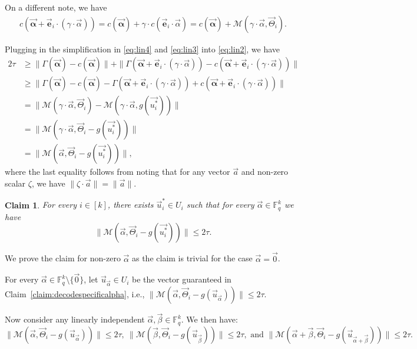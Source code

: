 \documentclass[11pt]{article}
\newcommand{\F}{\mathbb{F}}
\renewcommand{\ge}{ \geqslant}
\renewcommand{\le}{ \leqslant}
\newtheorem{claim}[theorem]{Claim}
\renewcommand{\kappa}{\tau}
\newcommand{\M}{\mathcal{M}}
\begin{document}
 
On a different note, we have
\begin{align}
c(\vec{\bm{\alpha}}+\vec{\bm e}_i\cdot (\gamma\cdot\vec{\alpha}))=c(\vec{\bm{\alpha}})+\gamma\cdot c(\vec{\bm e}_i\cdot \vec{\alpha})=c(\vec{\bm{\alpha}})+\M(\gamma\cdot \vec{\alpha},\vec{\Theta}_i).
\label{eq:lin3}
\end{align}

Plugging in the simplification in \eqref{eq:lin4} and \eqref{eq:lin3} into \eqref{eq:lin2}, we have
\allowdisplaybreaks
\begin{align*}
2\kappa&\ge\|\Gamma(\vec{\bm{\alpha}})-c(\vec{\bm{\alpha}})\|+\|\Gamma(\vec{\bm{\alpha}}+\vec{\bm e}_i\cdot (\gamma\cdot\vec{\alpha}))-c(\vec{\bm{\alpha}}+\vec{\bm e}_i\cdot (\gamma\cdot\vec{\alpha}))\|\\
&\ge\|\Gamma(\vec{\bm{\alpha}})-c(\vec{\bm{\alpha}})-\Gamma(\vec{\bm{\alpha}}+\vec{\bm e}_i\cdot (\gamma\cdot\vec{\alpha}))+c(\vec{\bm{\alpha}}+\vec{\bm e}_i\cdot (\gamma\cdot\vec{\alpha}))\|\\
&=\|\M(\gamma\cdot \vec{\alpha},\vec{\Theta}_i)-\M(\gamma\cdot\vec{\alpha},g(\vec{u_i^\ast})) \|\\
&=\|\M(\gamma\cdot \vec{\alpha},\vec{\Theta}_i-g(\vec{u_i^\ast})) \|\\
&=\|\M(  \vec{\alpha},\vec{\Theta}_i-g(\vec{u_i^\ast})) \|,
\end{align*}
 where the last equality follows from noting that for any vector $\vec{a}$ and non-zero scalar $\zeta$, we have $\|\zeta\cdot \vec{a}\|=\|\vec{a}\|$.



 
 
\begin{claim}\label{claim:decodei}
For every $i\in[k]$, there exists $\vec{u}_i^\ast\in U_i$  such that  for every $\vec{\alpha}\in\F_q^k$ we have $$ \|\M(  \vec{\alpha},\vec{\Theta}_i-g(\vec{u_i^\ast})) \|\le 2\kappa.$$ 
\end{claim}

We prove the claim for non-zero $\vec{\alpha}$ as the claim is trivial for the case $\vec{\alpha}=\vec{0}$.

For every $\vec{\alpha}\in\F_q^k\setminus \{\vec{0}\}$, let $\vec{u}_{\vec{\alpha}}\in U_i$ be the vector guaranteed in Claim~\ref{claim:decodespecificalpha}, i.e., 
$\|\M(  \vec{\alpha},\vec{\Theta}_i-g(\vec{u}_{\vec{\alpha}})) \|\le 2\kappa$. 

Now consider any linearly independent $\vec{\alpha},\vec{\beta}\in\F_q^k$. We then have: 
 $$
 \|\M(  \vec{\alpha},\vec{\Theta}_i-g(\vec{u}_{\vec{\alpha}})) \|\le 2\kappa,\ \|\M(  \vec{\beta},\vec{\Theta}_i-g(\vec{u}_{\vec{\beta}})) \|\le 2\kappa,\text{ and }\|\M(  \vec{\alpha}+\vec{\beta},\vec{\Theta}_i-g(\vec{u}_{\vec{\alpha}+\vec{\beta}})) \|\le 2\kappa.
 $$
\end{document}
